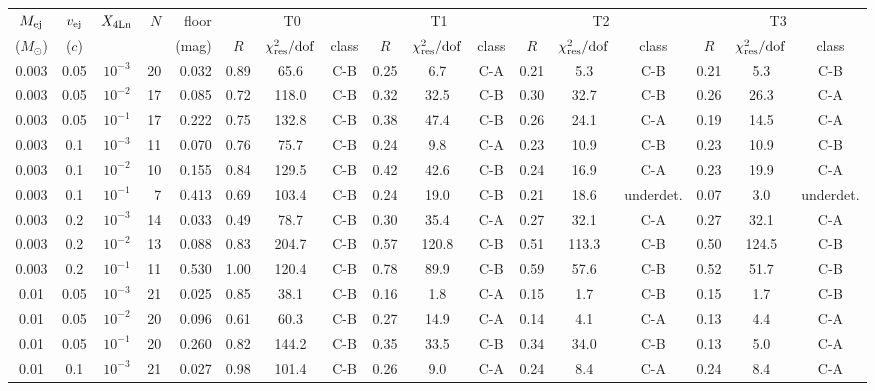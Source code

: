 \begin{tabular}{cccrrcccccccccccc}
\toprule
$M_{\rm ej}$ & $v_{\rm ej}$ & $X_{\rm 4Ln}$ & $N$ & floor & \multicolumn{3}{c}{T0} & \multicolumn{3}{c}{T1} & \multicolumn{3}{c}{T2} & \multicolumn{3}{c}{T3} \\
($M_\odot$) & ($c$) & & & (mag) & $R$ & $\chi^2_{\rm res}/{\rm dof}$ & class & $R$ & $\chi^2_{\rm res}/{\rm dof}$ & class & $R$ & $\chi^2_{\rm res}/{\rm dof}$ & class & $R$ & $\chi^2_{\rm res}/{\rm dof}$ & class \\
\midrule
0.003 & 0.05 & $10^{-3}$ & 20 & 0.032 & 0.89 & 65.6 & C-B & 0.25 & 6.7 & C-A & 0.21 & 5.3 & C-B & 0.21 & 5.3 & C-B \\
0.003 & 0.05 & $10^{-2}$ & 17 & 0.085 & 0.72 & 118.0 & C-B & 0.32 & 32.5 & C-B & 0.30 & 32.7 & C-B & 0.26 & 26.3 & C-A \\
0.003 & 0.05 & $10^{-1}$ & 17 & 0.222 & 0.75 & 132.8 & C-B & 0.38 & 47.4 & C-B & 0.26 & 24.1 & C-A & 0.19 & 14.5 & C-A \\
0.003 & 0.1 & $10^{-3}$ & 11 & 0.070 & 0.76 & 75.7 & C-B & 0.24 & 9.8 & C-A & 0.23 & 10.9 & C-B & 0.23 & 10.9 & C-B \\
0.003 & 0.1 & $10^{-2}$ & 10 & 0.155 & 0.84 & 129.5 & C-B & 0.42 & 42.6 & C-B & 0.24 & 16.9 & C-A & 0.23 & 19.9 & C-A \\
0.003 & 0.1 & $10^{-1}$ & 7 & 0.413 & 0.69 & 103.4 & C-B & 0.24 & 19.0 & C-B & 0.21 & 18.6 & underdet. & 0.07 & 3.0 & underdet. \\
0.003 & 0.2 & $10^{-3}$ & 14 & 0.033 & 0.49 & 78.7 & C-B & 0.30 & 35.4 & C-A & 0.27 & 32.1 & C-A & 0.27 & 32.1 & C-A \\
0.003 & 0.2 & $10^{-2}$ & 13 & 0.088 & 0.83 & 204.7 & C-B & 0.57 & 120.8 & C-B & 0.51 & 113.3 & C-B & 0.50 & 124.5 & C-B \\
0.003 & 0.2 & $10^{-1}$ & 11 & 0.530 & 1.00 & 120.4 & C-B & 0.78 & 89.9 & C-B & 0.59 & 57.6 & C-B & 0.52 & 51.7 & C-B \\
0.01 & 0.05 & $10^{-3}$ & 21 & 0.025 & 0.85 & 38.1 & C-B & 0.16 & 1.8 & C-A & 0.15 & 1.7 & C-B & 0.15 & 1.7 & C-B \\
0.01 & 0.05 & $10^{-2}$ & 20 & 0.096 & 0.61 & 60.3 & C-B & 0.27 & 14.9 & C-A & 0.14 & 4.1 & C-A & 0.13 & 4.4 & C-A \\
0.01 & 0.05 & $10^{-1}$ & 20 & 0.260 & 0.82 & 144.2 & C-B & 0.35 & 33.5 & C-B & 0.34 & 34.0 & C-B & 0.13 & 5.0 & C-A \\
0.01 & 0.1 & $10^{-3}$ & 21 & 0.027 & 0.98 & 101.4 & C-B & 0.26 & 9.0 & C-A & 0.24 & 8.4 & C-A & 0.24 & 8.4 & C-A \\

\end{tabular}
